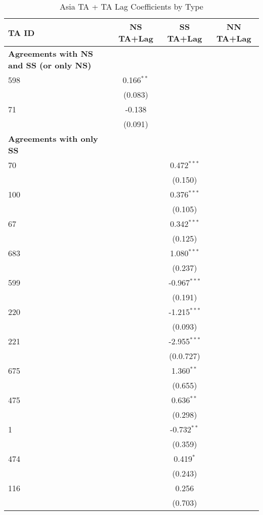 \begin{table}[htbp]
    \centering
    \caption{Asia TA + TA Lag Coefficients by Type}
    \label{tab:asia_pta}
    \begin{adjustbox}{max width=\textwidth}
    \begin{tabular}{lccc}
    \hline
    \textbf{TA ID} & \textbf{NS TA+Lag} & \textbf{SS TA+Lag} & \textbf{NN TA+Lag} \\
    \hline
    \textbf{Agreements with NS and SS (or only NS)} &  &  &  \\
    \hline
    598 & 0.166$^{\ast\ast}$ &  &  \\
    & (0.083) &  &  \\
    71 & -0.138 &  &  \\
    & (0.091) &  &  \\
    \hline
    \textbf{Agreements with only SS} &  &  &  \\
    \hline
    70 &  & 0.472$^{\ast\ast\ast}$ &  \\
    &  & (0.150) &  \\
    100 &  & 0.376$^{\ast\ast\ast}$ &  \\
    &  & (0.105) &  \\
    67 &  & 0.342$^{\ast\ast\ast}$ &  \\
    &  & (0.125) &  \\
    683 &  & 1.080$^{\ast\ast\ast}$ &  \\
    &  & (0.237) &  \\
    599 &  & -0.967$^{\ast\ast\ast}$ &  \\
    &  & (0.191) &  \\
    220 &  & -1.215$^{\ast\ast\ast}$ &  \\
    &  & (0.093) &  \\
    221 &  & -2.955$^{\ast\ast\ast}$ &  \\
    &  & (0.0.727) &  \\
    675 &  & 1.360$^{\ast\ast}$ &  \\
    &  & (0.655) &  \\
    475 &  & 0.636$^{\ast\ast}$ &  \\
    &  & (0.298) &  \\
    1 &  & -0.732$^{\ast\ast}$ &  \\
    &  & (0.359) &  \\
    474 &  & 0.419$^{\ast}$ &  \\
    &  & (0.243) &  \\
    116 &  & 0.256 &  \\
    &  & (0.703) &  \\

\end{tabular}
\end{adjustbox}
\end{table}
